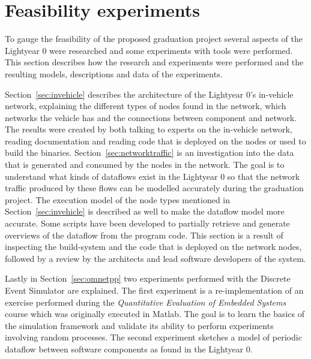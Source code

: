 \section{Feasibility experiments}
\label{sec:feasibility}
To gauge the feasibility of the proposed graduation project several aspects of the Lightyear 0 were researched and some experiments with tools were performed. This section describes how the research and experiments were performed and the resulting models, descriptions and data of the experiments.

Section~\ref{sec:invehicle} describes the architecture of the Lightyear 0's in-vehicle network, explaining the different types of nodes found in the network, which networks the vehicle has and the connections between component and network. The results were created by both talking to experts on the in-vehicle network, reading documentation and reading code that is deployed on the nodes or used to build the binaries. 
Section~\ref{sec:networktraffic} is an investigation into the data that is generated and consumed by the nodes in the network. The goal is to understand what kinds of dataflows exist in the Lightyear 0 so that the network traffic produced by these flows can be modelled accurately during the graduation project. The execution model of the node types mentioned in Section~\ref{sec:invehicle} is described as well to make the dataflow model more accurate. Some scripts have been developed to partially retrieve and generate overviews of the dataflow from the program code. This section is a result of inspecting the build-system and the code that is deployed on the network nodes, followed by a review by the architects and lead software developers of the system.

Lastly in Section~\ref{sec:omnetpp} two experiments performed with the Discrete Event Simulator \omnet are explained. The first experiment is a re-implementation of an exercise performed during the \textit{Quantitative Evaluation of Embedded Systems} course which was originally executed in Matlab. The goal is to learn the basics of the simulation framework and validate its ability to perform experiments involving random processes. The second experiment sketches a model of periodic dataflow between software components as found in the Lightyear 0.


\clearpage

\clearpage


\newpage